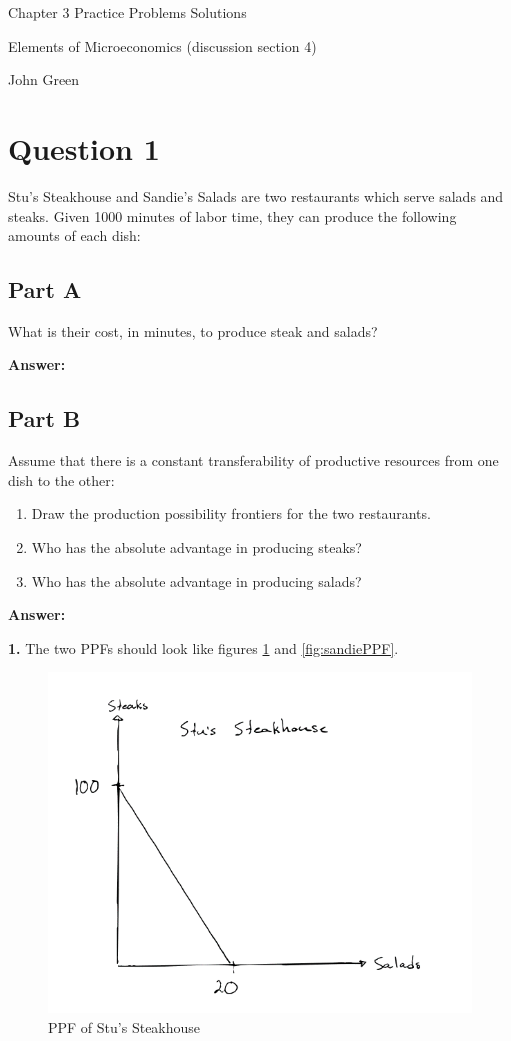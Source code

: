 \documentclass[12pt]{article}
\begin{document}
\begin{center}
\Large Chapter 3 Practice Problems Solutions

\medskip

\normalsize Elements of Microeconomics (discussion section 4)

\medskip

\small John Green
\end{center}

\medskip

\section*{Question 1}
Stu's Steakhouse and Sandie's Salads are two restaurants which serve salads and steaks. Given 1000 minutes of labor time, they can produce the following amounts of each dish:



\subsection*{Part A}

What is their cost, in minutes, to produce steak and salads?

\medskip

\textbf{Answer:}



\medskip

\subsection*{Part B}
Assume that there is a constant transferability of productive resources from one dish to the other:
\begin{enumerate}
    \item Draw the production possibility frontiers for the two restaurants.
    \item Who has the absolute advantage in producing steaks?
    \item Who has the absolute advantage in producing salads?
\end{enumerate}

\textbf{Answer:}

\textbf{1.} The two PPFs should look like figures \ref{fig:stuPPF} and \ref{fig:sandiePPF}.

\begin{figure}
    \centering
    \includegraphics[width=.6\textwidth]{stuPPF.png}
    \caption{PPF of Stu's Steakhouse}
    \label{fig:stuPPF}
\end{figure}
\end{document}
